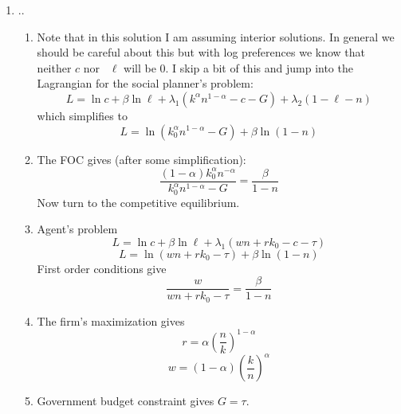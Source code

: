 \documentclass{article}
\begin{document}
\begin{enumerate}
\item ..

\begin{enumerate}
\item Note that in this solution I am assuming interior solutions. In
general we should be careful about this but with log preferences we know
that neither $c$ nor \ $\ell $ will be 0. I skip a bit of this and jump into
the Lagrangian for the social planner's problem:%
\begin{equation*}
L=\ln c+\beta \ln \ell +\lambda _{1}\left( k^{\alpha }n^{1-\alpha
}-c-G\right) +\lambda _{2}\left( 1-\ell -n\right)
\end{equation*}%
which simplifies to%
\begin{equation*}
L=\ln (k_{0}^{\alpha }n^{1-\alpha }-G)+\beta \ln \left( 1-n\right)
\end{equation*}

\item The FOC gives (after some simplification):%
\begin{equation}
\frac{\left( 1-\alpha \right) k_{0}^{\alpha }n^{-\alpha }}{k_{0}^{\alpha
}n^{1-\alpha }-G}=\frac{\beta }{1-n}  \label{OPT1}
\end{equation}%
Now turn to the competitive equilibrium. \ 

\item Agent's problem%
\begin{equation*}
L=\ln c+\beta \ln \ell +\lambda _{1}\left( wn+rk_{0}-c-\tau \right)
\end{equation*}%
\begin{equation*}
L=\ln \left( wn+rk_{0}-\tau \right) +\beta \ln \left( 1-n\right)
\end{equation*}%
First order conditions give%
\begin{equation}
\frac{w}{wn+rk_{0}-\tau }=\frac{\beta }{1-n}  \label{foc}
\end{equation}

\item The firm's maximization gives 
\begin{equation}
r=\alpha \left( \frac{n}{k}\right) ^{1-\alpha }  \label{r}
\end{equation}%
\begin{equation}
w=\left( 1-\alpha \right) \left( \frac{k}{n}\right) ^{\alpha }  \label{w}
\end{equation}

\item Government budget constraint gives $G=\tau .$


\end{enumerate}
\end{enumerate}
\end{document}
